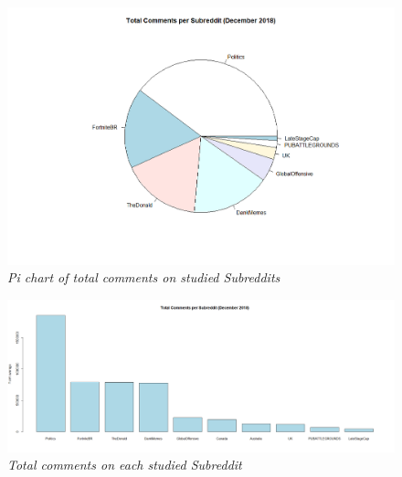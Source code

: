 \begin{figure}[H]
    \centering
    \includegraphics[width=1.0\textwidth]{graphs/piechart_counts.png}
    \caption{\textit{Pi chart of total comments on studied Subreddits}}
    \label{fig:pichart}
\end{figure}

\begin{figure}[H]
    \centering
    \includegraphics[width=1.0\textwidth]{graphs/BarGraph_TotalComments.png}
    \caption{\textit{Total comments on each studied Subreddit}}
    \label{fig:pichart}
\end{figure}


